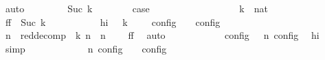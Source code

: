 \begin{isabellebody}
\ auto\isanewline
\ \ \isamarkupfalse%
\isanewline
\ \ \ \ \isamarkupfalse%
\ {\isacharparenleft}Suc\ k{\isacharparenright}\isanewline
\ \ \ \ \ \ \isamarkupfalse%
\ {\isacharquery}case\isanewline
\ \ \ \ \ \ \isamarkupfalse%
\ {\isacharminus}\isanewline
\ \ \ \ \ \ \ \ \isamarkupfalse%
\ k\ {\isacharcolon}{\isacharcolon}\ nat\isanewline
\ \ \ \ \ \ \ \ \isamarkupfalse%
\ ff{\isacharcolon}\ {\isacartoucheopen}{\isasymS}\ {\isasymhookrightarrow}\isactrlbsup Suc\ k\isactrlesup \ {\isasymS}\isanewline
\ \ \ \ \ \ \ \ \isamarkupfalse%
\ hi{\isacharcolon}\ {\isacartoucheopen}{\isasymAnd}{\isasymS}\ {\isasymS}\ {\isasymhookrightarrow}\isactrlbsup k\isactrlesup \ {\isasymS}\ {\isasymLongrightarrow}\ {\isasymlbrakk}\ {\isasymS}\ {\isasymrbrakk}\isactrlsub c\isactrlsub o\isactrlsub n\isactrlsub f\isactrlsub i\isactrlsub g\ {\isasymsubseteq}\ {\isasymlbrakk}\ {\isasymS}\ {\isasymrbrakk}\isactrlsub c\isactrlsub o\isactrlsub n\isactrlsub f\isactrlsub i\isactrlsub g{\isacartoucheclose}\isanewline
\ \ \ \ \ \ \ \ \isamarkupfalse%
\ {\isasymS}\isactrlsub n\ \ red{\isacharunderscore}decomp{\isacharcolon}\ {\isacartoucheopen}{\isacharparenleft}{\isasymS}\ {\isasymhookrightarrow}\isactrlbsup k\isactrlesup \ {\isasymS}\isactrlsub n{\isacharparenright}\ {\isasymand}\ {\isacharparenleft}{\isasymS}\isactrlsub n\ {\isasymhookrightarrow}\ {\isasymS}\ \isamarkupfalse%
\ ff\ \isamarkupfalse%
\ auto\isanewline
\ \ \ \ \ \ \ \ \isamarkupfalse%
\ {\isacartoucheopen}{\isasymlbrakk}\ {\isasymS}\ {\isasymrbrakk}\isactrlsub c\isactrlsub o\isactrlsub n\isactrlsub f\isactrlsub i\isactrlsub g\ {\isasymsupseteq}\ {\isasymlbrakk}\ {\isasymS}\isactrlsub n\ {\isasymrbrakk}\isactrlsub c\isactrlsub o\isactrlsub n\isactrlsub f\isactrlsub i\isactrlsub g{\isacartoucheclose}\ \isamarkupfalse%
\ hi\ \isamarkupfalse%
\ simp\isanewline
\ \ \ \ \ \ \ \ \isamarkupfalse%
\ \isamarkupfalse%
\ {\isacartoucheopen}{\isasymlbrakk}\ {\isasymS}\isactrlsub n\ {\isasymrbrakk}\isactrlsub c\isactrlsub o\isactrlsub n\isactrlsub f\isactrlsub i\isactrlsub g\ {\isasymsupseteq}\ {\isasymlbrakk}\ {\isasymS}\ {\isasymrbrakk}\isactrlsub c\isactrlsub o\isactrlsub n\isactrlsub f\isactrlsub i\isactrlsub g{\isacartoucheclose}\ \isamarkupfalse%

\end{isabellebody}
